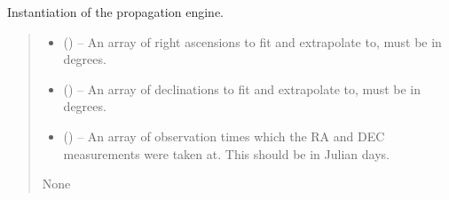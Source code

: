 \documentclass[letterpaper,11pt,english]{sphinxmanual}
\begin{document}
\begin{savenotes}
\begin{fulllineitems}
\begin{savenotes}\begin{fulllineitems}
\label{\detokenize{code/opihiexarata.propagate.polynomial:opihiexarata.propagate.polynomial.QuadraticPropagationEngine.__init__}}
\pysigstartsignatures
{}
\pysigstopsignatures
\sphinxAtStartPar
Instantiation of the propagation engine.
\begin{quote}\begin{description}
\begin{itemize}
\item {} 
\sphinxAtStartPar
{} () – An array of right ascensions to fit and extrapolate to, must be in
degrees.

\item {} 
\sphinxAtStartPar
{} () – An array of declinations to fit and extrapolate to, must be in
degrees.

\item {} 
\sphinxAtStartPar
{} () – An array of observation times which the RA and DEC measurements
were taken at. This should be in Julian days.

\end{itemize}

\sphinxAtStartPar
None

\end{description}\end{quote}

\end{fulllineitems}\end{savenotes}



\end{fulllineitems}
\end{savenotes}
\end{document}
